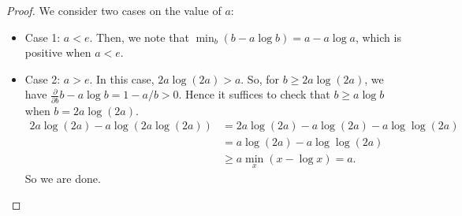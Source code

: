 \documentclass[10pt,a4paper]{amsart}
\begin{document}
\begin{proof}
    We consider two cases on the value of $a$:
    \begin{itemize}
        \item Case 1: $a < e$. Then, we note that $\min_b (b - a\log b) = a - a \log a$, which is positive when $a < e$.
        \item Case 2: $a > e$. In this case, $2a \log(2a) > a$.
        So, for $b \ge 2a \log(2a)$, we have $\frac{\partial}{\partial b} b - a \log b = 1 - a/b > 0$.
        Hence it suffices to check that $b \ge a \log b$ when $b = 2a\log(2a)$.
        \begin{align*}
            2a \log(2a) - a \log(2a \log(2a))
            &= 2a \log(2a) - a \log(2a) - a \log\log(2a) \\
            &= a \log(2a) - a \log\log(2a) \\
            &\ge a \min_x (x - \log x) = a.
        \end{align*}
        So we are done.
    \end{itemize}
\end{proof} 
\end{document}
